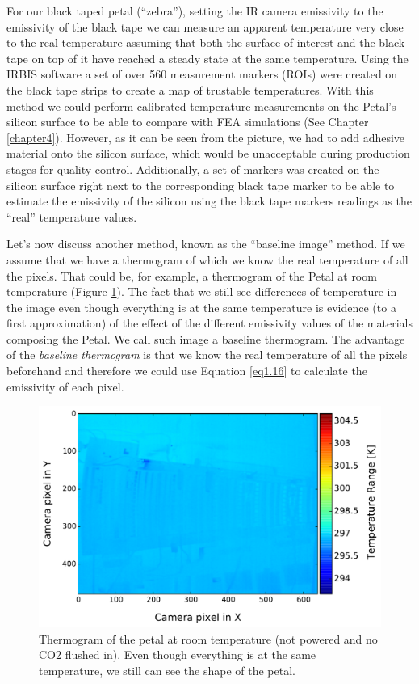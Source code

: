 		For our black taped petal (“zebra”), setting the IR camera emissivity to the emissivity of the black tape we can measure an apparent temperature very close to the real temperature assuming that both the surface of interest and the black tape on top of it have reached a steady state at the same temperature. Using the IRBIS software a set of over 560 measurement markers (ROIs) were created on the black tape strips to create a map of trustable temperatures. With this method we could perform calibrated temperature measurements on the Petal’s silicon surface to be able to compare with FEA simulations (See Chapter \ref{chapter4}). However, as it can be seen from the picture, we had to add adhesive material onto the silicon surface, which would be unacceptable during production stages for quality control. Additionally, a set of markers was created on the silicon surface right next to the corresponding black tape marker to be able to estimate the emissivity of the silicon using the black tape markers readings as the “real” temperature values. 
		
		Let’s now discuss another method, known as the “baseline image” method. If we assume that we have a thermogram of which we know the real temperature of all the pixels. That could be, for example, a thermogram of the Petal at room temperature (Figure \ref{fig3.3}). The fact that we still see differences of temperature in the image even though everything is at the same temperature is evidence (to a first approximation) of the effect of the different emissivity values of the materials composing the Petal. We call such image a baseline thermogram. The advantage of the \textit{baseline thermogram} is that we know the real temperature of all the pixels beforehand and therefore we could use Equation \ref{eq1.16} to calculate the emissivity of each pixel. 
	
		\begin{figure}[ht!]
			\centering
			\captionsetup{justification=centering,margin=2cm}
			\includegraphics[scale=0.55]{Figures/Chapter03/thermo_Temp_201708091701_avg.pdf}
			\caption{Thermogram of the petal at room temperature (not powered and no CO2 flushed in). Even though everything is at the same temperature, we still can see the shape of the petal.}\label{fig3.3}
		\end{figure}
	
